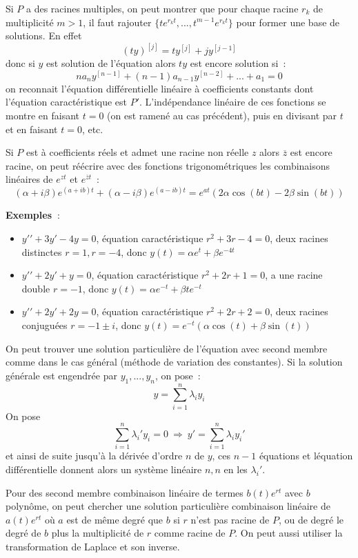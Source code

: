 \documentclass[a4paper,11pt]{article}
\begin{document}
\begin{giacjshere}
Si $P$ a des racines multiples, on peut montrer que pour chaque
racine $r_k$ de multiplicit\'e $m>1$, il faut rajouter
$\{ te^{r_kt}, ..., t^{m-1} e^{r_kt} \}$ pour former une base
de solutions. En effet
$$ (ty)^{[j]} = t y^{[j]} + j y^{[j-1]}$$
donc si $y$ est solution de l'\'equation alors $ty$ est encore solution
si~:
$$na_n y^{[n-1]} + (n-1)a_{n-1} y^{[n-2]}+...+a_1=0$$
on reconnait l'\'equation diff\'erentielle lin\'eaire \`a coefficients
constants dont l'\'equation caract\'eristique est $P'$.
L'ind\'ependance lin\'eaire de ces fonctions
se montre en faisant $t=0$ (on est ramen\'e au cas pr\'ec\'edent), 
puis en divisant par $t$ et en faisant $t=0$, etc.

Si $P$ est \`a coefficients r\'eels et admet une racine non r\'eelle
$z$ alors $\overline{z}$ est encore racine, on peut r\'e\'ecrire 
avec des fonctions trigonom\'etriques
les combinaisons lin\'eaires de $e^{zt}$ et $e^{\overline{z}t}$~:
$$ (\alpha + i \beta) e^{(a+ib)t} + (\alpha - i \beta)  e^{(a-ib)t}
=  e^{at} ( 2 \alpha \cos(bt) - 2 \beta \sin(bt) )$$

{\bf Exemples~}: 
\begin{itemize}
\item $y'{'}+3y'-4y=0$, \'equation caract\'eristique $r^2+3r-4=0$,
deux racines distinctes $r=1, r=-4$, donc $y(t)=\alpha e^t+\beta e^{-4t}$
\item $y'{'}+2y'+y=0$, \'equation caract\'eristique $r^2+2r+1=0$,
a une racine double $r=-1$, donc $y(t)=\alpha e^{-t}+\beta t e^{-t}$
\item $y'{'}+2y'+2y=0$, \'equation caract\'eristique $r^2+2r+2=0$,
deux racines conjugu\'ees $r=-1\pm i$, donc
$y(t)=e^{-t}(\alpha \cos(t)+\beta \sin(t))$
\end{itemize}

On peut trouver une solution particuli\`ere de l'\'equation avec
second membre comme dans le cas g\'en\'eral (m\'ethode de variation
des constantes). Si la solution g\'en\'erale est engendr\'ee par
$y_1,...,y_n$, on pose~:
$$ y=\sum_{i=1}^n \lambda_i y_i$$
On pose
$$ \sum_{i=1}^n \lambda_i' y_i=0 \ \Rightarrow \ 
y'=\sum_{i=1}^n \lambda_i y_i'$$
et ainsi de suite jusqu'\`a la d\'eriv\'ee d'ordre $n$ de $y$, ces
$n-1$ \'equations et l\'equation diff\'erentielle donnent 
alors un syst\`eme lin\'eaire $n,n$ en
les $\lambda_i'$.

Pour des second membre combinaison lin\'eaire
de termes $b(t)e^{rt}$ avec $b$ polyn\^ome,
on peut chercher une solution particuli\`ere
combinaison lin\'eaire de $a(t)e^{rt}$ o\`u $a$ est de m\^eme
degr\'e que $b$ si $r$ n'est pas racine de $P$, ou de degr\'e le
degr\'e de $b$ plus la multiplicit\'e de $r$ comme racine de $P$.
On peut aussi utiliser la transformation de Laplace et son inverse.


\end{giacjshere}
\end{document}
